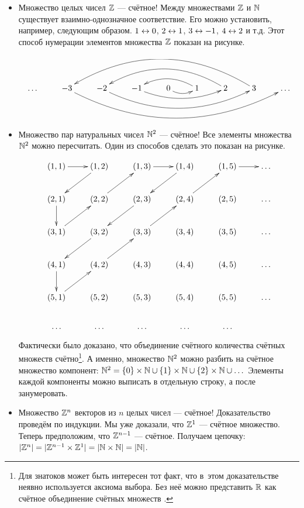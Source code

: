 \documentclass[12pt, a4paper]{article}
\begin{document}
\begin{itemize}
    \item Множество целых чисел $\mathbb Z$ --- счётное! Между множествами $\mathbb Z$ и $\mathbb N$ существует взаимно-однозначное соответствие. Его можно установить, например, следующим образом. $1 \leftrightarrow 0$, $2 \leftrightarrow 1$, $3 \leftrightarrow -1$, $4 \leftrightarrow 2$ и т.д. Этот способ нумерации элементов множества $\mathbb Z$ показан на рисунке.

\begin{center}
    \[ \xymatrix{ & & & & & & & \\
    \dots & -3 \ar@/_3pc/[rrrrrrr] & -2 \ar@/_2pc/[rrrrr] & -1 \ar@/_1pc/[rrr] & 0 \ar@/_/[r] & 1 \ar@/_1pc/[ll] & 2 \ar@/_2pc/[llll] & 3 \ar@/_3pc/[llllll] & \dots \\
     & & & & & & & }
    \]
\end{center}

\item Множество пар натуральных чисел $\mathbb N^{2}$ --- счётное! Все элементы множества $\mathbb N^{2}$ можно пересчитать. Один из способов сделать это показан на рисунке.

\begin{center}
    \[ \xymatrix{
    (1,1) \ar[r] &  (1,2) \ar[ld]  &  (1,3) \ar[r]  & (1,4) \ar[ld]  & (1,5)  \ar[r] & \dots  \\
    (2,1) \ar[d] & (2,2) \ar[ru]  & (2,3) \ar[ld]  & (2,4) \ar[ur] & (2,5) &  \dots\\
    (3,1) \ar[ru] & (3,2) \ar[ld] & (3,3) \ar[ur] & (3,4) & (3,5)  & \dots \\
    (4,1) \ar[d] & (4,2) \ar[ur] & (4,3) & (4,4) & (4,5)  & \dots \\
    (5,1) \ar[ur] & (5,2) & (5,3) & (5,4) & (5,5)  & \dots \\
    \dots & \dots & \dots & \dots & \dots  }
    \]
\end{center}

Фактически было доказано, что объединение счётного количества счётных множеств счётно\footnote{Для знатоков может быть интересен тот факт, что в~этом доказательстве неявно используется аксиома выбора. Без неё можно представить $\mathbb R$ как счётное объединение счётных множеств \cite{williams:wto}.}. А именно, множество $\mathbb N^2$ можно разбить на счётное множество компонент: $\mathbb N^2 = \{0\} \times \mathbb N \cup \{1\} \times \mathbb N \cup \{2\} \times \mathbb N \cup \dots$ Элементы каждой компоненты можно выписать в отдельную строку, а после занумеровать.

\item Множество $\mathbb Z^{n}$ векторов из $n$ целых чисел  --- счётное!
Доказательство проведём по индукции. Мы уже доказали, что $\mathbb Z^{1}$ --- счётное множество. Теперь предположим, что $ \mathbb Z^{n-1} $ --- счётное. Получаем цепочку: $ |\mathbb Z^{n}|=| \mathbb Z^{n-1} \times \mathbb Z^{1}| =|\mathbb N \times \mathbb N| = |\mathbb N| $.


\end{itemize}
\end{document}
